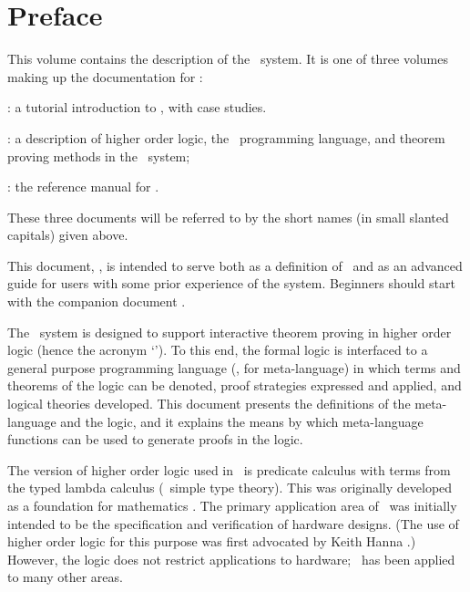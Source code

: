 \chapter*{Preface}
\label{intro}

This volume contains the  description of  the \HOL\  system.
It is one of three volumes making up the documentation for \HOL:

\begin{myenumerate}
\item \TUTORIAL: a tutorial introduction to \HOL, with case studies.
\item \DESCRIPTION: a description of higher order logic,
the \ML\ programming language, and theorem proving methods in the \HOL\ system;
\item \REFERENCE: the reference manual for \HOL.
\end{myenumerate}

\noindent These three documents will be referred to by the short names (in
small slanted capitals) given above.

This document, \DESCRIPTION, is intended to serve both as a definition of \HOL\
and as an advanced guide for users with some prior experience of the system.
Beginners should start with the companion document \TUTORIAL.

The \HOL\ system is designed to support interactive theorem proving in higher
order logic (hence the acronym `\HOL').  To this end, the formal logic is
interfaced to a general purpose programming language (\ML, for meta-language)
in which terms and theorems of the logic can be denoted, proof strategies
expressed and applied, and logical theories developed.  This document presents
the definitions of the meta-language and the logic, and it explains the means
by which meta-language functions can be used to generate proofs in the logic.

The version of higher order logic used in \HOL\ is predicate calculus with
terms from the typed lambda calculus (\ie\ simple type theory). This was
originally developed as a foundation for mathematics \cite{Church}.  The
primary application area of \HOL\ was initially intended to be the
specification and verification of hardware designs.  (The use of higher order
logic for this purpose was first advocated by Keith Hanna \cite{Hanna-Daeche}.)
However, the logic does not restrict applications to hardware; \HOL\ has been
applied to many other areas.

